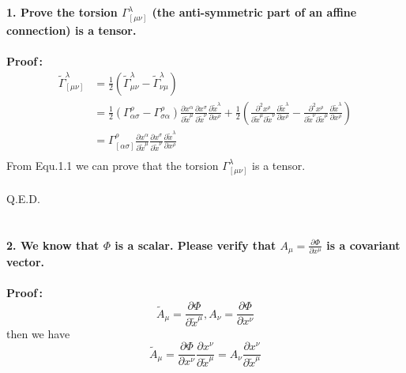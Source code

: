 \documentclass[12pt]{article}
\begin{document}
\textbf{1. Prove the torsion $\displaystyle\Gamma^{\lambda}_{[\mu\nu]}$ (the anti-symmetric part of an affine connection) is a tensor.} \\		%
~\\
\textbf{Proof\,:} 	%
\begin{equation}
\begin{aligned}
 \displaystyle \widetilde\Gamma^{\lambda}_{[\mu\nu]} &= \frac{1}{2}(\widetilde\Gamma^{\lambda}_{\mu\nu}-\widetilde\Gamma^{\lambda}_{\nu\mu}) \\
&= \frac{1}{2}(\Gamma^{\rho}_{\alpha\sigma}-\Gamma^{\rho}_{\sigma\alpha}) \frac{\partial x^{\alpha}}{\partial\widetilde x^{\mu}} \frac{\partial x^{\sigma}}{\partial \widetilde x^{\nu}} \frac{\partial\widetilde x^{\lambda}}{\partial x^{\rho}}+\frac{1}{2}(\frac{\partial^{2}x^{\rho}}{\partial\widetilde x^{\mu}\partial\widetilde x^{\nu}}\frac{\partial\widetilde x^{\lambda}}{\partial x^{\rho}} - \frac{\partial^{2}x^{\rho}}{\partial\widetilde x^{\nu}\partial\widetilde x^{\mu}}\frac{\partial\widetilde x^{\lambda}}{\partial x^{\rho}})\\
&= \Gamma^{\rho}_{[\alpha\sigma]}\frac{\partial x^{\alpha}}{\partial\widetilde x^{\mu}} \frac{\partial x^{\sigma}}{\partial \widetilde x^{\nu}} \frac{\partial\widetilde x^{\lambda}}{\partial x^{\rho}}\\
\end{aligned}
	\tag{1.1}
\end{equation}
From Equ.1.1 we can prove that the torsion $\displaystyle\Gamma^{\lambda}_{[\mu\nu]}$ is a tensor.\\
~\\
Q.E.D.
~\\
~\\
~\\
\textbf{2. We know that $\Phi$ is a scalar. Please verify that $\displaystyle A_{\mu}=\frac{\partial\Phi}{\partial x^{\mu}}$ is a covariant vector.} \\		
~\\
\textbf{Proof\,:} \begin{equation} 		%
\displaystyle \widetilde{A}_{\mu}=\frac{\partial\Phi}{\partial\widetilde{x}^{\mu}}, A_{\nu}=\frac{\partial\Phi}{\partial x^{\nu}}
	\tag{2.1}
\end{equation}
then we have
\begin{equation}
\displaystyle \widetilde{A}_{\mu}=\frac{\partial\Phi}{\partial x^{\nu}}\frac{\partial x^{\nu}}{\partial\widetilde{x}^{\mu}}=A_{\nu}\frac{\partial x^{\nu}}{\partial\widetilde{x}^{\mu}}
	\tag{2.2}
\end{equation}
\end{document}
